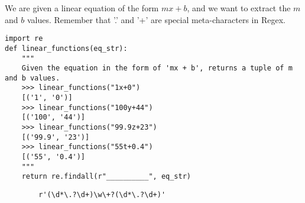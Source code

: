 \begin{blocksection}
\question We are given a linear equation of the form $mx+b$, and we want to extract the $m$ and $b$ values. Remember that '.' and '+' are special meta-characters in Regex.

\begin{lstlisting}
import re
def linear_functions(eq_str):
    """
    Given the equation in the form of 'mx + b', returns a tuple of m and b values.
    >>> linear_functions("1x+0")
    [('1', '0')]
    >>> linear_functions("100y+44")
    [('100', '44')]
    >>> linear_functions("99.9z+23")
    [('99.9', '23')]
    >>> linear_functions("55t+0.4")
    [('55', '0.4')]
    """
    return re.findall(r"__________", eq_str)
\end{lstlisting}

\begin{solution}[2in]
    \begin{lstlisting}
        r'(\d*\.?\d+)\w\+?(\d*\.?\d+)'
    \end{lstlisting}
\end{solution}
\end{blocksection}
